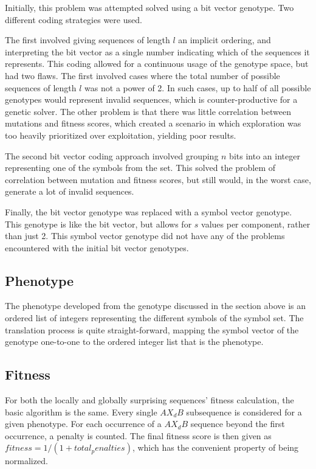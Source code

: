 \documentclass[twocolumn,oneside]{amsart}
\begin{document}
Initially, this problem was attempted solved using a bit vector genotype.
Two different coding strategies were used.

The first involved giving sequences of length $ l $ an implicit ordering, and interpreting the bit vector as a single number indicating which of the sequences it represents.
This coding allowed for a continuous usage of the genotype space, but had two flaws.
The first involved cases where the total number of possible sequences of length $ l $ was not a power of 2.
In such cases, up to half of all possible genotypes would represent invalid sequences, which is counter-productive for a genetic solver.
The other problem is that there was little correlation between mutations and fitness scores, which created a scenario in which exploration was too heavily prioritized over exploitation, yielding poor results.

The second bit vector coding approach involved grouping $ n $ bits into an integer representing one of the symbols from the set.
This solved the problem of correlation between mutation and fitness scores, but still would, in the worst case, generate a lot of invalid sequences.

Finally, the bit vector genotype was replaced with a symbol vector genotype.
This genotype is like the bit vector, but allows for $ s $ values per component, rather than just 2.
This symbol vector genotype did not have any of the problems encountered with the initial bit vector genotypes.

\subsection{Phenotype}

The phenotype developed from the genotype discussed in the section above is an ordered list of integers representing the different symbols of the symbol set.
The translation process is quite straight-forward, mapping the symbol vector of the genotype one-to-one to the ordered integer list that is the phenotype.

\subsection{Fitness}
For both the locally and globally surprising sequences' fitness calculation, the basic algorithm is the same.
Every single $ AX_dB $ subsequence is considered for a given phenotype.
For each occurrence of a $ AX_dB $ sequence beyond the first occurrence, a penalty is counted.
The final fitness score is then given as $ fitness = 1 / (1 + total_penalties) $, which has the convenient property of being normalized.
\end{document}
